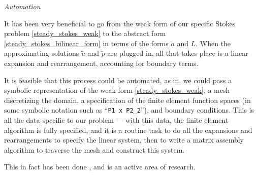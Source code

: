 \begin{aside}
\textit{Automation}
\vskip 0.1in

It has been very beneficial to go from the weak form of our specific Stokes problem
\eqref{steady_stokes_weak} to the abstract form \eqref{steady_stokes_bilinear_form} in terms of the forms $a$ and $L$.
When the approximating solutions $\tilde{u}$ and $\tilde{p}$ are plugged in, all that
takes place is a linear expansion and rearrangement, accounting for boundary terms.

It is feasible that this process could be automated, as in, we could pass a symbolic representation of the weak form
\eqref{steady_stokes_weak}, a mesh discretizing the domain, a specification of the finite element function spaces
(in some symbolic notation such as ``\texttt{P1 x P2\_2}''),
and boundary conditions. This is all the data specific to our problem --- with this data, the finite element algorithm
is fully specified, and it is a routine task to do all the expansions and rearrangements to specify the linear system,
then to write a matrix assembly algorithm to traverse the mesh and construct this system.

This in fact has been done
\cite{fenics_book} \cite{DOLFIN} \cite{firedrake} \cite{automating_fem},
and is an active area of research.

\end{aside}






